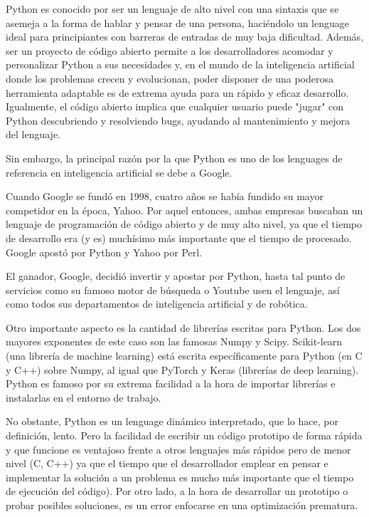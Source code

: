 Python es conocido por ser un lenguaje de alto nivel con una sintaxis que se asemeja a la forma de hablar y pensar de una persona, haciéndolo un lenguage ideal para principiantes con barreras de entradas de muy baja dificultad. Además, ser un proyecto de código abierto permite a los desarrolladores acomodar y personalizar Python a sus necesidades y, en el mundo de la inteligencia artificial donde los problemas crecen y evolucionan, poder disponer de una poderosa herramienta adaptable es de extrema ayuda para un rápido y eficaz desarrollo. Igualmente, el código abierto implica que cualquier usuario puede "jugar" con Python descubriendo y resolviendo bugs, ayudando al mantenimiento y mejora del lenguaje.

Sin embargo, la principal razón por la que Python es uno de los lenguages de referencia en inteligencia artificial se debe a Google.

Cuando Google se fundó en 1998, cuatro años se había fundido su mayor competidor en la época, Yahoo. Por aquel entonces, ambas empresas buscaban un lenguaje de programación de código abierto y de muy alto nivel, ya que el tiempo de desarrollo era (y es) muchísimo más importante que el tiempo de procesado. Google apostó por Python y Yahoo por Perl.

El ganador, Google, decidió invertir y apostar por Python, hasta tal punto de servicios como su famoso motor de búsqueda o Youtube usen el lenguaje, así como todos sus departamentos de inteligencia artificial y de robótica\cite{intheplex}.

Otro importante aspecto es la cantidad de librerías escritas para Python. Los dos mayores exponentes de este caso son las famosas Numpy y Scipy. Scikit-learn (una librería de machine learning) está escrita específicamente para Python (en C y C++) sobre Numpy, al igual que PyTorch y Keras (librerías de deep learning). Python es famoso por su extrema facilidad a la hora de importar librerías e instalarlas en el entorno de trabajo.

No obstante, Python es un lenguage dinámico interpretado, que lo hace, por definición, lento. Pero la facilidad de escribir un código prototipo de forma rápida y que funcione es ventajoso frente a otros lenguajes más rápidos pero de menor nivel (C, C++) ya que el tiempo que el desarrollador emplear en pensar e implementar la solución a un problema es mucho más importante que el tiempo de ejecución del código). 
Por otro lado, a la hora de desarrollar un prototipo o probar posibles soluciones, es un error enfocarse en una optimización prematura\cite{artofcomputer}.



